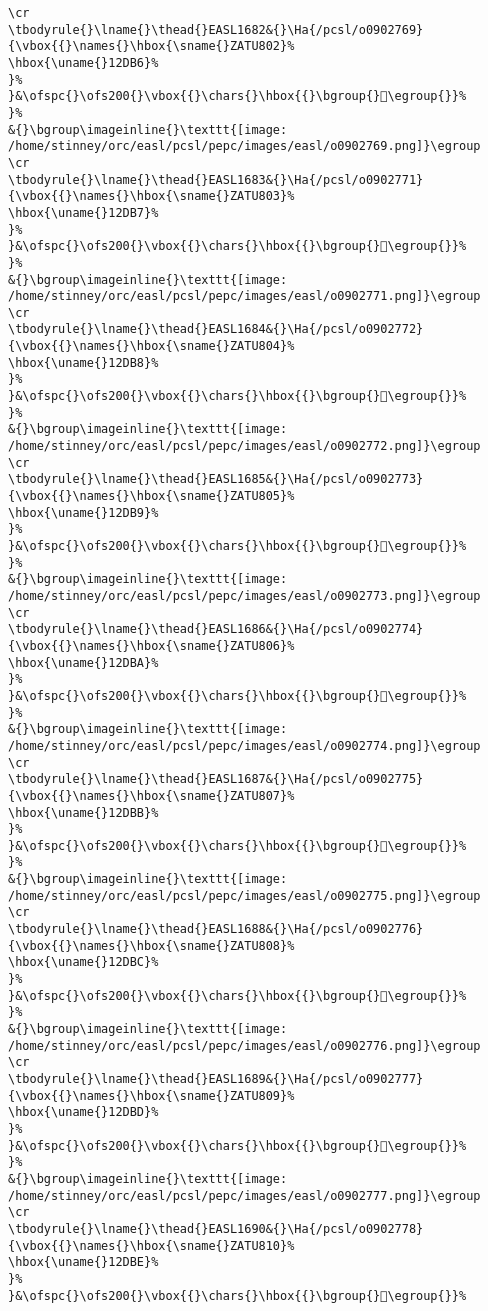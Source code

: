 \begin{verbatim}
\cr
\tbodyrule{}\lname{}\thead{}EASL1682&{}\Ha{/pcsl/o0902769}{\vbox{{}\names{}\hbox{\sname{}ZATU802}%
\hbox{\uname{}12DB6}%
}%
}&\ofspc{}\ofs200{}\vbox{{}\chars{}\hbox{{}\bgroup{}𒶶\egroup{}}%
}%
&{}\bgroup\imageinline{}\texttt{[image: /home/stinney/orc/easl/pcsl/pepc/images/easl/o0902769.png]}\egroup
\cr
\tbodyrule{}\lname{}\thead{}EASL1683&{}\Ha{/pcsl/o0902771}{\vbox{{}\names{}\hbox{\sname{}ZATU803}%
\hbox{\uname{}12DB7}%
}%
}&\ofspc{}\ofs200{}\vbox{{}\chars{}\hbox{{}\bgroup{}𒶷\egroup{}}%
}%
&{}\bgroup\imageinline{}\texttt{[image: /home/stinney/orc/easl/pcsl/pepc/images/easl/o0902771.png]}\egroup
\cr
\tbodyrule{}\lname{}\thead{}EASL1684&{}\Ha{/pcsl/o0902772}{\vbox{{}\names{}\hbox{\sname{}ZATU804}%
\hbox{\uname{}12DB8}%
}%
}&\ofspc{}\ofs200{}\vbox{{}\chars{}\hbox{{}\bgroup{}𒶸\egroup{}}%
}%
&{}\bgroup\imageinline{}\texttt{[image: /home/stinney/orc/easl/pcsl/pepc/images/easl/o0902772.png]}\egroup
\cr
\tbodyrule{}\lname{}\thead{}EASL1685&{}\Ha{/pcsl/o0902773}{\vbox{{}\names{}\hbox{\sname{}ZATU805}%
\hbox{\uname{}12DB9}%
}%
}&\ofspc{}\ofs200{}\vbox{{}\chars{}\hbox{{}\bgroup{}𒶹\egroup{}}%
}%
&{}\bgroup\imageinline{}\texttt{[image: /home/stinney/orc/easl/pcsl/pepc/images/easl/o0902773.png]}\egroup
\cr
\tbodyrule{}\lname{}\thead{}EASL1686&{}\Ha{/pcsl/o0902774}{\vbox{{}\names{}\hbox{\sname{}ZATU806}%
\hbox{\uname{}12DBA}%
}%
}&\ofspc{}\ofs200{}\vbox{{}\chars{}\hbox{{}\bgroup{}𒶺\egroup{}}%
}%
&{}\bgroup\imageinline{}\texttt{[image: /home/stinney/orc/easl/pcsl/pepc/images/easl/o0902774.png]}\egroup
\cr
\tbodyrule{}\lname{}\thead{}EASL1687&{}\Ha{/pcsl/o0902775}{\vbox{{}\names{}\hbox{\sname{}ZATU807}%
\hbox{\uname{}12DBB}%
}%
}&\ofspc{}\ofs200{}\vbox{{}\chars{}\hbox{{}\bgroup{}𒶻\egroup{}}%
}%
&{}\bgroup\imageinline{}\texttt{[image: /home/stinney/orc/easl/pcsl/pepc/images/easl/o0902775.png]}\egroup
\cr
\tbodyrule{}\lname{}\thead{}EASL1688&{}\Ha{/pcsl/o0902776}{\vbox{{}\names{}\hbox{\sname{}ZATU808}%
\hbox{\uname{}12DBC}%
}%
}&\ofspc{}\ofs200{}\vbox{{}\chars{}\hbox{{}\bgroup{}𒶼\egroup{}}%
}%
&{}\bgroup\imageinline{}\texttt{[image: /home/stinney/orc/easl/pcsl/pepc/images/easl/o0902776.png]}\egroup
\cr
\tbodyrule{}\lname{}\thead{}EASL1689&{}\Ha{/pcsl/o0902777}{\vbox{{}\names{}\hbox{\sname{}ZATU809}%
\hbox{\uname{}12DBD}%
}%
}&\ofspc{}\ofs200{}\vbox{{}\chars{}\hbox{{}\bgroup{}𒶽\egroup{}}%
}%
&{}\bgroup\imageinline{}\texttt{[image: /home/stinney/orc/easl/pcsl/pepc/images/easl/o0902777.png]}\egroup
\cr
\tbodyrule{}\lname{}\thead{}EASL1690&{}\Ha{/pcsl/o0902778}{\vbox{{}\names{}\hbox{\sname{}ZATU810}%
\hbox{\uname{}12DBE}%
}%
}&\ofspc{}\ofs200{}\vbox{{}\chars{}\hbox{{}\bgroup{}𒶾\egroup{}}%

\end{verbatim}

